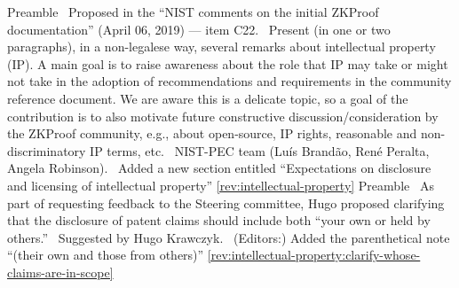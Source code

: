 Preamble
\newcol \ccontext\ Proposed in the ``NIST comments on the initial ZKProof documentation'' (April 06, 2019) --- item C22.
				\propContrib\ Present (in one or two paragraphs), in a non-legalese way, several remarks about intellectual property (IP). A main goal is to raise awareness about the role that IP may take or might not take in the adoption of recommendations and requirements in the community reference document. We are aware this is a delicate topic, so a goal of the contribution is to also motivate future constructive discussion/consideration by the ZKProof community, e.g., about open-source, IP rights, reasonable and non-discriminatory IP terms, etc.
\newcol {}
\newcol \contributors\ NIST-PEC team (Luís Brandão, René Peralta, Angela Robinson).
				\Chan\ Added a new section entitled ``Expectations on disclosure and licensing of intellectual property''
\newcol \ref{rev:intellectual-property}
\rowendL
Preamble
\newcol \propContrib\ As part of requesting feedback to the Steering committee, Hugo proposed 
clarifying that the disclosure of patent claims should include both ``your own or held by others.''
\newcol {}
\newcol \contributors\ Suggested by Hugo Krawczyk.
				\Chan\ (Editors:) Added the parenthetical note ``(their own and those from others)''
\newcol \ref{rev:intellectual-property:clarify-whose-claims-are-in-scope}
\rowendL
\myendIssue



